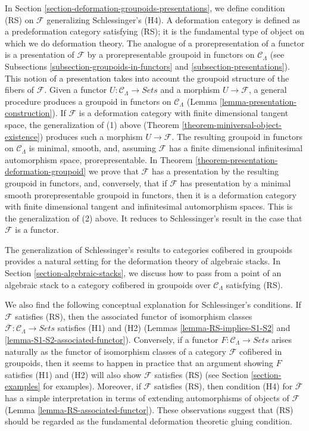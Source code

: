 \medskip \noindent
In Section \ref{section-deformation-groupoids-presentations}, we define 
condition (RS) on $\mathcal{F}$ generalizing Schlessinger's (H4).  A deformation 
category is defined as a predeformation category satisfying (RS); it is the 
fundamental type of object on which we do deformation theory. The analogue of a 
prorepresentation of a functor is a presentation of $\mathcal{F}$ by a 
prorepresentable groupoid in functors on $\mathcal{C}_\Lambda$ (see 
Subsections \ref{subsection-groupoids-in-functors} and 
\ref{subsection-presentations}). This notion of a presentation takes into 
account the groupoid structure of the fibers of $\mathcal{F}$. Given a functor 
$U: \mathcal{C}_\Lambda \to \textit{Sets}$ and a morphism $U 
\to \mathcal{F}$, a general procedure produces a groupoid in functors on 
$\mathcal{C}_\Lambda$ (Lemma \ref{lemma-presentation-construction}).  If 
$\mathcal{F}$ is a deformation category with finite dimensional tangent space, 
the generalization of (1) above (Theorem 
\ref{theorem-miniversal-object-existence}) produces such a morphism $U 
\to \mathcal{F}$.  The resulting groupoid in functors on $\mathcal 
C_\Lambda$ is minimal, smooth, and, assuming $\mathcal{F}$ has a finite 
dimensional infinitesimal automorphism space, prorepresentable. In Theorem 
\ref{theorem-presentation-deformation-groupoid} we prove that $\mathcal{F}$ has 
a presentation by the resulting groupoid in functors, and, conversely, that if 
$\mathcal{F}$ has presentation by a minimal smooth prorepresentable groupoid in 
functors, then it is a deformation category with finite dimensional tangent and 
infinitesimal automorphism spaces. This is the generalization of (2) above. It 
reduces to Schlessinger's result in the case that $\mathcal{F}$ is a functor.

\medskip \noindent
The generalization of Schlessinger's results to categories cofibered in 
groupoids provides a natural setting for the deformation theory of algebraic 
stacks.  In Section \ref{section-algebraic-stacks}, we discuss how to pass from 
a point of an algebraic stack to a category cofibered in groupoids over 
$\mathcal{C}_\Lambda$ satisfying (RS).

\medskip \noindent
We also find the following conceptual explanation for Schlessinger's 
conditions.  If $\mathcal{F}$ satisfies (RS), then the associated functor of 
isomorphism classes $\overline{\mathcal{F}}: \mathcal{C}_\Lambda \to 
\textit{Sets}$ satisfies (H1) and (H2) (Lemmas 
\ref{lemma-RS-implies-S1-S2} and \ref{lemma-S1-S2-associated-functor}).  
Conversely, if a functor $F: \mathcal{C}_\Lambda \to 
\textit{Sets}$ arises naturally as the functor of isomorphism classes of 
a category $\mathcal{F}$ cofibered in groupoids, then it seems to happen in 
practice that an argument showing $F$ satisfies (H1) and (H2) will also show 
$\mathcal{F}$ satisfies (RS) (see Section \ref{section-examples} for examples).  
Moreover, if $\mathcal{F}$ satisfies (RS), then condition (H4) for 
$\overline{\mathcal{F}}$ has a simple interpretation in terms of extending 
automorphisms of objects of $\mathcal{F}$ (Lemma 
\ref{lemma-RS-associated-functor}).  These observations suggest that (RS) 
should be regarded as the fundamental deformation theoretic gluing condition.




